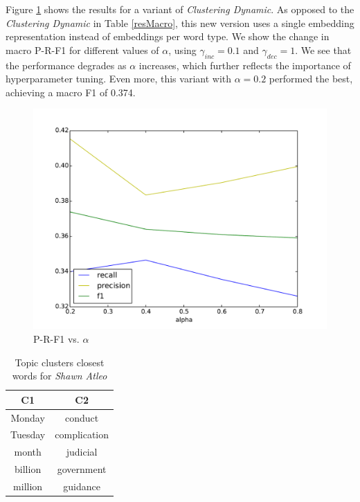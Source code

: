 \documentclass{article}
\begin{document}
{{%

Figure \ref{varyingalpha} shows the results for a variant of {\textit{Clustering Dynamic}}. As opposed to the {\textit{Clustering Dynamic}} in Table \ref{resMacro}, this new version uses a single embedding representation instead of embeddings per word type. We show the change in macro P-R-F1 for different values of $\alpha$, using $\gamma_{inc}=0.1$ and $\gamma_{dec}=1$. We see that the performance degrades as $\alpha$ increases, which further reflects the importance of hyperparameter tuning. Even more, this variant with $\alpha=0.2$ performed the best, achieving a macro F1 of 0.374.

\begin{figure}[tb]
\centering
\includegraphics[width=0.8\columnwidth]{fig/alphaPlotMacro.pdf}
\caption{P-R-F1 vs. $\alpha$}
\label{varyingalpha}
\end{figure}

\begin{table}[tb]
\center
\begin{tabular}{cc}
\toprule
\textbf{C1} & \textbf{C2} \\
\midrule
Monday & conduct \\ %
Tuesday & complication \\ %
month & judicial \\ %
billion & government \\ %
million & guidance \\
\bottomrule
\end{tabular}
\caption{Topic clusters closest words for \emph{Shawn Atleo}}
\label{clusterresult}
\end{table}

}}
\end{document}
